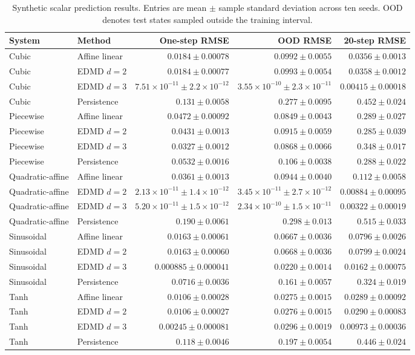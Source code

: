 \documentclass[11pt]{article}
\begin{document}
\begin{table}[ht]
\centering
\scriptsize
\setlength{\tabcolsep}{4pt}
\begin{tabular}{llrrr}
\toprule
System & Method & One-step RMSE & OOD RMSE & 20-step RMSE \\
\midrule
Cubic & Affine linear & $0.0184\pm0.00078$ & $0.0992\pm0.0055$ & $0.0356\pm0.0013$ \\
Cubic & EDMD $d=2$ & $0.0184\pm0.00077$ & $0.0993\pm0.0054$ & $0.0358\pm0.0012$ \\
Cubic & EDMD $d=3$ & $7.51\times10^{-11}\pm2.2\times10^{-12}$ & $3.55\times10^{-10}\pm2.3\times10^{-11}$ & $0.00415\pm0.00018$ \\
Cubic & Persistence & $0.131\pm0.0058$ & $0.277\pm0.0095$ & $0.452\pm0.024$ \\
\addlinespace
Piecewise & Affine linear & $0.0472\pm0.00092$ & $0.0849\pm0.0043$ & $0.289\pm0.027$ \\
Piecewise & EDMD $d=2$ & $0.0431\pm0.0013$ & $0.0915\pm0.0059$ & $0.285\pm0.039$ \\
Piecewise & EDMD $d=3$ & $0.0327\pm0.0012$ & $0.0868\pm0.0066$ & $0.348\pm0.017$ \\
Piecewise & Persistence & $0.0532\pm0.0016$ & $0.106\pm0.0038$ & $0.288\pm0.022$ \\
\addlinespace
Quadratic-affine & Affine linear & $0.0361\pm0.0013$ & $0.0944\pm0.0040$ & $0.112\pm0.0058$ \\
Quadratic-affine & EDMD $d=2$ & $2.13\times10^{-11}\pm1.4\times10^{-12}$ & $3.45\times10^{-11}\pm2.7\times10^{-12}$ & $0.00884\pm0.00095$ \\
Quadratic-affine & EDMD $d=3$ & $5.20\times10^{-11}\pm1.5\times10^{-12}$ & $2.34\times10^{-10}\pm1.5\times10^{-11}$ & $0.00322\pm0.00019$ \\
Quadratic-affine & Persistence & $0.190\pm0.0061$ & $0.298\pm0.013$ & $0.515\pm0.033$ \\
\addlinespace
Sinusoidal & Affine linear & $0.0163\pm0.00061$ & $0.0667\pm0.0036$ & $0.0796\pm0.0026$ \\
Sinusoidal & EDMD $d=2$ & $0.0163\pm0.00060$ & $0.0668\pm0.0036$ & $0.0799\pm0.0024$ \\
Sinusoidal & EDMD $d=3$ & $0.000885\pm0.000041$ & $0.0220\pm0.0014$ & $0.0162\pm0.00075$ \\
Sinusoidal & Persistence & $0.0716\pm0.0036$ & $0.161\pm0.0057$ & $0.324\pm0.019$ \\
\addlinespace
Tanh & Affine linear & $0.0106\pm0.00028$ & $0.0275\pm0.0015$ & $0.0289\pm0.00092$ \\
Tanh & EDMD $d=2$ & $0.0106\pm0.00027$ & $0.0276\pm0.0015$ & $0.0290\pm0.00083$ \\
Tanh & EDMD $d=3$ & $0.00245\pm0.000081$ & $0.0296\pm0.0019$ & $0.00973\pm0.00036$ \\
Tanh & Persistence & $0.118\pm0.0046$ & $0.197\pm0.0054$ & $0.446\pm0.024$ \\
\bottomrule
\end{tabular}
\caption{Synthetic scalar prediction results. Entries are mean $\pm$ sample standard deviation across ten seeds. OOD denotes test states sampled outside the training interval.}
\label{tab:results}
\end{table}
\end{document}
